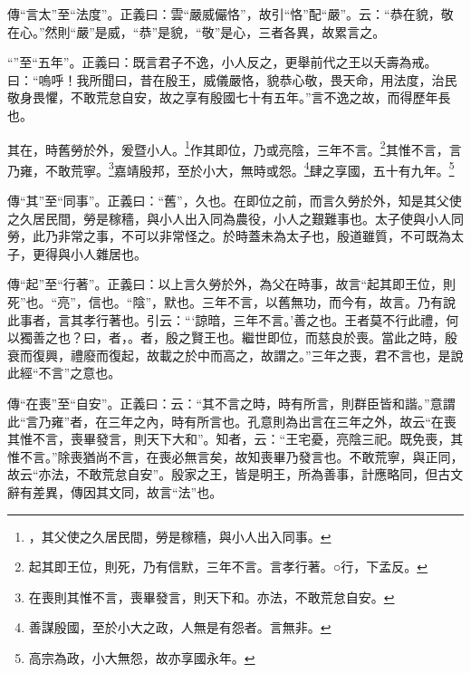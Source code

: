 {\noindent\zhuan{}\fzbyks 傳“言太”至“法度”。正義曰：雲“嚴威儼恪”，故引“恪”配“嚴”。云：“恭在貌，敬在心。”然則“嚴”是威，“恭”是貌，“敬”是心，三者各異，故累言之。 \par}

{\noindent\shu{}\fzkt “”至“五年”。正義曰：既言君子不逸，小人反之，更舉前代之王以夭壽為戒。曰：“嗚呼！我所聞曰，昔在殷王，威儀嚴恪，貌恭心敬，畏天命，用法度，治民敬身畏懼，不敢荒怠自安，故之享有殷國七十有五年。”言不逸之故，而得歷年長也。 \par}

其在，時舊勞於外，爰暨小人。\footnote{，其父使之久居民間，勞是稼穡，與小人出入同事。}作其即位，乃或亮陰，三年不言。\footnote{起其即王位，則死，乃有信默，三年不言。言孝行著。○行，下孟反。}其惟不言，言乃雍，不敢荒寧。\footnote{在喪則其惟不言，喪畢發言，則天下和。亦法，不敢荒怠自安。}嘉靖殷邦，至於小大，無時或怨。\footnote{善謀殷國，至於小大之政，人無是有怨者。言無非。}肆之享國，五十有九年。\footnote{高宗為政，小大無怨，故亦享國永年。}


{\noindent\zhuan{}\fzbyks 傳“其”至“同事”。正義曰：“舊”，久也。在即位之前，而言久勞於外，知是其父使之久居民間，勞是稼穡，與小人出入同為農役，小人之艱難事也。太子使與小人同勞，此乃非常之事，不可以非常怪之。於時蓋未為太子也，殷道雖質，不可既為太子，更得與小人雜居也。 \par}

{\noindent\zhuan{}\fzbyks 傳“起”至“行著”。正義曰：以上言久勞於外，為父在時事，故言“起其即王位，則死”也。“亮”，信也。“陰”，默也。三年不言，以舊無功，而今有，故言。乃有說此事者，言其孝行著也。引云：“‘諒暗，三年不言。’善之也。王者莫不行此禮，何以獨善之也？曰，者，。者，殷之賢王也。繼世即位，而慈良於喪。當此之時，殷衰而復興，禮廢而復起，故載之於中而高之，故謂之。”三年之喪，君不言也，是說此經“不言”之意也。 \par}

{\noindent\zhuan{}\fzbyks 傳“在喪”至“自安”。正義曰：云：“其不言之時，時有所言，則群臣皆和諧。”意謂此“言乃雍”者，在三年之內，時有所言也。孔意則為出言在三年之外，故云“在喪其惟不言，喪畢發言，則天下大和”。知者，云：“王宅憂，亮陰三祀。既免喪，其惟不言。”除喪猶尚不言，在喪必無言矣，故知喪畢乃發言也。不敢荒寧，與正同，故云“亦法，不敢荒怠自安”。殷家之王，皆是明王，所為善事，計應略同，但古文辭有差異，傳因其文同，故言“法”也。 \par}

